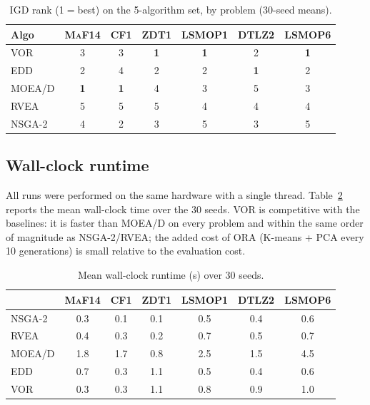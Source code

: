 \documentclass[preprint,12pt]{elsarticle}
\begin{document}
\begin{table}[t]
\centering
\caption{IGD rank (1$=$best) on the 5-algorithm set, by problem
(30-seed means).}
\label{tab:ranks}
\small
\begin{tabular}{lcccccc}
\toprule
\textbf{Algo} & \textsc{MaF14} & \textsc{CF1} & \textsc{ZDT1}
 & \textsc{LSMOP1} & \textsc{DTLZ2} & \textsc{LSMOP6}\\
\midrule
\textsc{VOR}  & 3 & 3 & \textbf{1} & \textbf{1} & 2 & \textbf{1}\\
\textsc{EDD}  & 2 & 4 & 2 & 2 & \textbf{1} & 2\\
\textsc{MOEA/D}& \textbf{1} & \textbf{1} & 4 & 3 & 5 & 3\\
\textsc{RVEA} & 5 & 5 & 5 & 4 & 4 & 4\\
\textsc{NSGA-2}& 4 & 2 & 3 & 5 & 3 & 5\\
\bottomrule
\end{tabular}
\end{table}

\subsection{Wall-clock runtime}
\label{sec:runtime}
All runs were performed on the same hardware with a single thread.
Table~\ref{tab:runtime} reports the mean wall-clock time over the
30 seeds. \textsc{VOR} is competitive with the baselines: it is
faster than \textsc{MOEA/D} on every problem and within the same
order of magnitude as \textsc{NSGA-2}/\textsc{RVEA}; the added
cost of \textsc{ORA} (K-means + PCA every 10 generations) is
small relative to the evaluation cost.

\begin{table}[t]
\centering
\caption{Mean wall-clock runtime (s) over 30 seeds.}
\label{tab:runtime}
\small
\begin{tabular}{lcccccc}
\toprule
  & \textsc{MaF14} & \textsc{CF1} & \textsc{ZDT1}
  & \textsc{LSMOP1} & \textsc{DTLZ2} & \textsc{LSMOP6}\\
\midrule
\textsc{NSGA-2} & 0.3 & 0.1 & 0.1 & 0.5 & 0.4 & 0.6\\
\textsc{RVEA}   & 0.4 & 0.3 & 0.2 & 0.7 & 0.5 & 0.7\\
\textsc{MOEA/D} & 1.8 & 1.7 & 0.8 & 2.5 & 1.5 & 4.5\\
\textsc{EDD}    & 0.7 & 0.3 & 1.1 & 0.5 & 0.4 & 0.6\\
\textsc{VOR}    & 0.3 & 0.3 & 1.1 & 0.8 & 0.9 & 1.0\\
\bottomrule
\end{tabular}
\end{table}
\end{document}
